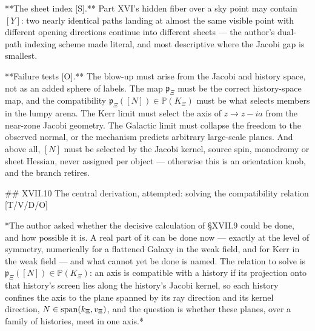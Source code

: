 **The sheet index [S].** Part XVI's hidden fiber over a sky point may contain $[Y]$: two nearly identical paths landing at almost the same visible point with different opening directions continue into different sheets — the author's dual-path indexing scheme made literal, and most descriptive where the Jacobi gap is smallest.

**Failure tests [O].** The blow-up must arise from the Jacobi and history space, not as an added sphere of labels. The map $\mathfrak p_\Xi$ must be the correct history-space map, and the compatibility $\mathfrak p_\Xi([N])\in\mathbb P(K_\Xi)$ must be what selects members in the lumpy arena. The Kerr limit must select the axis of $z\to z-ia$ from the near-zone Jacobi geometry. The Galactic limit must collapse the freedom to the observed normal, or the mechanism predicts arbitrary large-scale planes. And above all, $[N]$ must be selected by the Jacobi kernel, source spin, monodromy or sheet Hessian, never assigned per object — otherwise this is an orientation knob, and the branch retires.

## XVII.10 The central derivation, attempted: solving the compatibility relation [T/V/D/O]

*The author asked whether the decisive calculation of §XVII.9 could be done, and how possible it is. A real part of it can be done now — exactly at the level of symmetry, numerically for a flattened Galaxy in the weak field, and for Kerr in the weak field — and what cannot yet be done is named. The relation to solve is $\mathfrak p_\Xi([N])\in\mathbb P(K_\Xi)$: an axis is compatible with a history if its projection onto that history's screen lies along the history's Jacobi kernel, so each history confines the axis to the plane spanned by its ray direction and its kernel direction, $N\in{\rm span}(k_\Xi,v_\Xi)$, and the question is whether these planes, over a family of histories, meet in one axis.*

